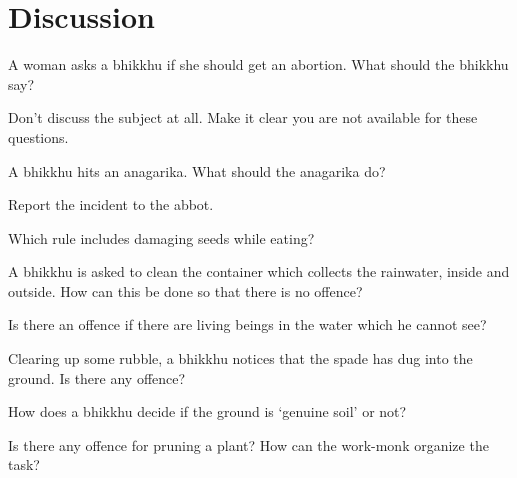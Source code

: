 \section*{Discussion}

A woman asks a bhikkhu if she should get an abortion. What should the bhikkhu say?

\begin{solution}
  Don't discuss the subject at all. Make it clear you are not available for these questions.
\end{solution}

\bigskip

A bhikkhu hits an anagarika. What should the anagarika do?

\begin{solution}
  Report the incident to the abbot.
\end{solution}

\bigskip

Which rule includes damaging seeds while eating?

\bigskip

A bhikkhu is asked to clean the container which collects the rainwater, inside and outside.
How can this be done so that there is no offence?

\bigskip

Is there an offence if there are living beings in the water which he cannot see?

\bigskip

Clearing up some rubble, a bhikkhu notices that the spade has dug into the ground. Is there any offence?

\bigskip

How does a bhikkhu decide if the ground is `genuine soil' or not?

\bigskip

Is there any offence for pruning a plant? How can the work-monk organize the task?

